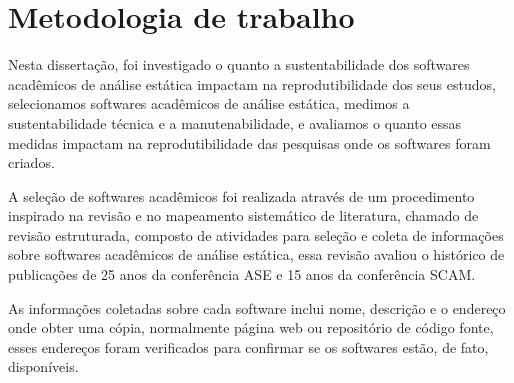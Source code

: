 %
%

\section{Metodologia de trabalho}

Nesta dissertação, foi investigado o quanto a sustentabilidade dos softwares
acadêmicos de análise estática impactam na reprodutibilidade dos seus estudos,
selecionamos softwares acadêmicos de análise estática, medimos a
sustentabilidade técnica e a manutenabilidade, e avaliamos o quanto essas medidas
impactam na reprodutibilidade das pesquisas onde os softwares foram criados.

A seleção de softwares acadêmicos foi realizada através de um procedimento
inspirado na revisão e no mapeamento sistemático de literatura, chamado de
revisão estruturada, composto de atividades para seleção e coleta de
informações sobre softwares acadêmicos de análise estática, essa revisão
avaliou o histórico de publicações de 25 anos da conferência ASE e 15 anos da
conferência SCAM.

As informações coletadas sobre cada software inclui nome, descrição e o
endereço onde obter uma cópia, normalmente página web ou repositório de código
fonte, esses endereços foram verificados para confirmar se os softwares estão,
de fato, disponíveis.

